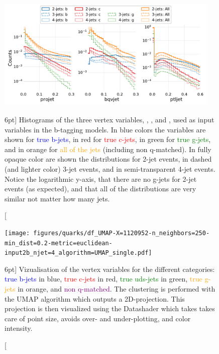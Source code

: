 \documentclass[a4paper, twoside, nobib]{tufte-book}
\newcommand{\code}[1]{\colorbox{light-gray}{\texttt{\detokenize{#1}}}}
\begin{document}
\begin{figure}
  \includegraphics[width=0.95\textwidth, trim=0 0 0 0, clip]{figures/quarks/btagging_variables_hist-down_sample=1.00-ML_vars=vertex-selection=b-ejet_min=4-n_iter_RS_lgb=99-n_iter_RS_xgb=9-cdot_cut=0.90-version=19.pdf}
  \caption[Histograms of the vertex variables][6pt]
          {Histograms of the three vertex variables, \code{projet}, \code{bqvjet}, and \code{ptljet}, used as input variables in the b-tagging models. In blue colors the variables are shown for \textcolor{blue}{true b-jets}, in red for \textcolor{red}{true c-jets}, in green for \textcolor{green}{true g-jets}, and in orange for \textcolor{orange}{all of the jets} (including non q-matched). In fully opaque color are shown the distributions for 2-jet events, in dashed (and lighter color) 3-jet events, and in semi-transparent 4-jet events. Notice the logarithmic y-axis, that there are no g-jets for 2-jet events (as expected), and that all of the distributions are very similar not matter how many jets.
          } 
  \label{fig:q:vertex_variables}
\end{figure}



\begin{figure}
  \texttt{[image: figures/quarks/df\_UMAP-X=1120952-n\_neighbors=250-min\_dist=0.2-metric=euclidean-input2b\_njet=4\_algorithm=UMAP\_single.pdf]}
  \caption[UMAP vizualisation of vertex variables][6pt]
          {Vizualisation of the vertex variables for the different categories: \textcolor{blue}{true b-jets} in blue, \textcolor{red}{true c-jets} in red, \textcolor{green}{true uds-jets} in green, \textcolor{orange}{true g-jets} in orange, and \textcolor{purple}{non q-matched}. The clustering is performed with the UMAP algorithm which outputs a 2D-projection. This projection is then visualized using the Datashader which takes takes care of point size, avoids over- and under-plotting, and color intensity. 
          } 
  \label{fig:q:UMAP_vertex}
\end{figure}
\end{document}
